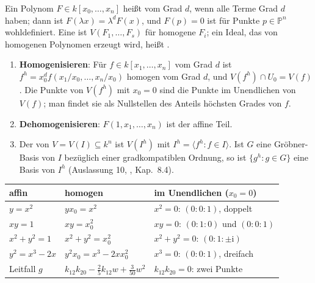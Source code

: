\begin{merksatz}
Ein Polynom $F\in k[x_0, \ldots, x_n]$ heißt  vom Grad $d$, wenn alle Terme Grad $d$ haben; dann ist $F(\lambda x) = \lambda^{d}F(x)$, und $F(p) = 0$ ist für Punkte $p\in\mathbb P^{n}$ wohldefiniert. Eine  ist $V(F_1, \ldots, F_s)$ für homogene $F_i$; ein Ideal, das von homogenen Polynomen erzeugt wird, heißt .
\begin{enumerate}[label=(\alph*), leftmargin=1.6em]
\item \textbf{Homogenisieren}: Für $f\in k[x_1, \ldots, x_n]$ vom Grad $d$ ist $f^{h} = x_0^{d}f(x_1/x_0, \ldots, x_n/x_0)$ homogen vom Grad $d$, und $V(f^{h})\cap U_0 = V(f)$. Die Punkte von $V(f^{h})$ mit $x_0 = 0$ sind die Punkte im Unendlichen von $V(f)$; man findet sie als Nullstellen des Anteils höchsten Grades von $f$.
\item \textbf{Dehomogenisieren}: $F(1, x_1, \ldots, x_n)$ ist der affine Teil.
\item Der  von $V = V(I)\subseteq k^{n}$ ist $V(I^{h})$ mit $I^{h} = \langle f^{h} : f\in I\rangle$. Ist $G$ eine Gröbner-Basis von $I$ bezüglich einer gradkompatiblen Ordnung, so ist $\{g^{h} : g\in G\}$ eine Basis von $I^{h}$ (Auslassung 10, , Kap.~8.4).
\end{enumerate}

\begin{center}
{\small
\renewcommand{\arraystretch}{1.5}
\begin{tabular}{@{}P{2.6cm}P{2.6cm}P{3.4cm}@{}}
\toprule
\textbf{affin} & \textbf{homogen} & \textbf{im Unendlichen ($x_0 = 0$)}\\
\midrule
$y = x^{2}$ & $yx_0 = x^{2}$ & $x^{2} = 0$: $(0 : 0 : 1)$, doppelt\\
$xy = 1$ & $xy = x_0^{2}$ & $xy = 0$: $(0 : 1 : 0)$ und $(0 : 0 : 1)$\\
$x^{2} + y^{2} = 1$ & $x^{2} + y^{2} = x_0^{2}$ & $x^{2} + y^{2} = 0$: $(0 : 1 : \pm\mathrm i)$\\
$y^{2} = x^{3} - 2x$ & $y^{2}x_0 = x^{3} - 2xx_0^{2}$ & $x^{3} = 0$: $(0 : 0 : 1)$, dreifach\\
Leitfall $g$ & $k_{12}k_{20} - \tfrac25k_{12}w + \tfrac{3}{50}w^{2}$ & $k_{12}k_{20} = 0$: zwei Punkte\\
\bottomrule
\end{tabular}}
\end{center}


\end{merksatz}
